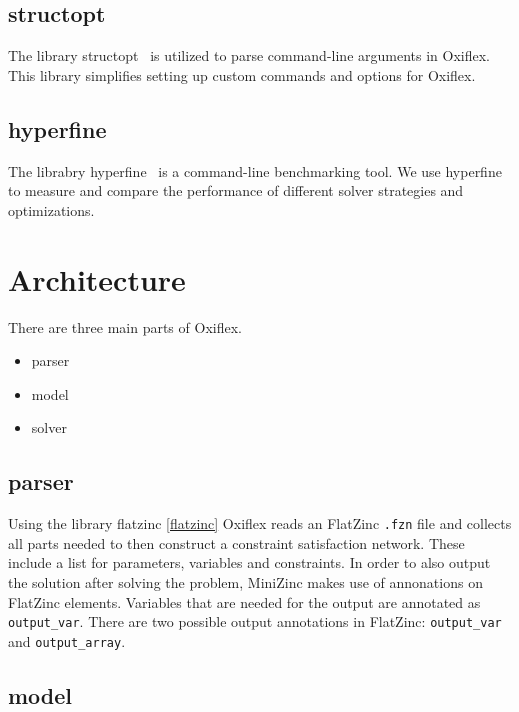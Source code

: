 \subsection{structopt}

The library structopt~\cite{structopt:2020} is utilized to parse command-line arguments in Oxiflex. This library simplifies setting up custom commands and options for Oxiflex.

\subsection{hyperfine}

The librabry hyperfine~\cite{hyperfine:2023} is a command-line benchmarking tool. We use hyperfine to measure and compare the performance of different solver strategies and optimizations.

\section{Architecture}

There are three main parts of Oxiflex.

\begin{itemize}
	\item parser
	\item model
	\item solver
\end{itemize}

\subsection{parser}

Using the library flatzinc \ref{flatzinc} Oxiflex reads an FlatZinc \verb|.fzn| file and collects all parts needed to then construct a constraint satisfaction network. These include a list for parameters, variables and constraints. In order to also output the solution after solving the problem, MiniZinc makes use of annonations on FlatZinc elements. Variables that are needed for the output are annotated as \verb|output_var|. There are two possible output annotations in FlatZinc: \verb|output_var| and \verb|output_array|.

\subsection{model} \label{model}

